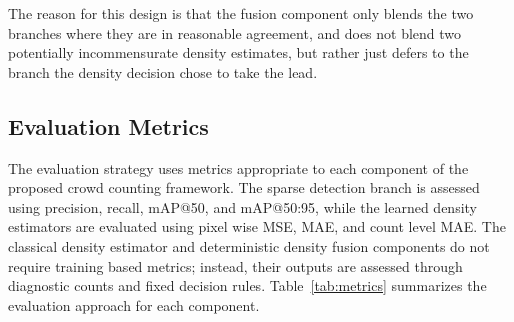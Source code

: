 \documentclass[12pt,a4paper]{report}
\begin{document}
The reason for this design is that the fusion component only blends the two branches where they are in reasonable agreement, and does not blend two potentially incommensurate density estimates, but rather just defers to the branch the density decision chose to take the lead.

\subsection{Evaluation Metrics}
\label{subsec:evaluation-metrics}

The evaluation strategy uses metrics appropriate to each component of the proposed crowd counting framework. The sparse detection branch is assessed using precision, recall, mAP@50, and mAP@50:95, while the learned density estimators are evaluated using pixel wise MSE, MAE, and count level MAE. The classical density estimator and deterministic density fusion components do not require training based metrics; instead, their outputs are assessed through diagnostic counts and fixed decision rules. Table~\ref{tab:metrics} summarizes the evaluation approach for each component.
\end{document}
